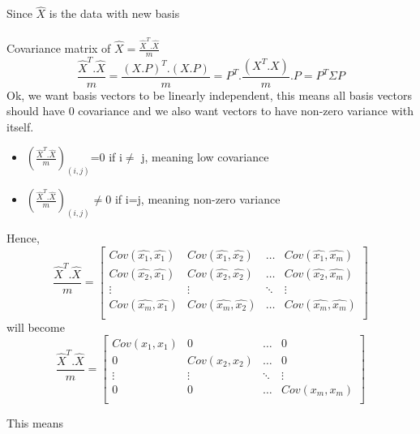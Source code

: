 \documentclass{article}
\begin{document}
Since $\hat{X}$ is the data with new basis\\\\
Covariance matrix of $\hat{X}=\frac{\hat{X}^T.\hat{X}}{m}$\\
$$
  \frac{\hat{X}^T.\hat{X}}{m}=\frac{(X.P)^T.(X.P)}{m}=P^T.\frac{(X^T.X)}{m}.P=P^T\Sigma P
$$
Ok, we want basis vectors to be linearly independent, this means all basis vectors should have 0 covariance and we also want vectors to have non-zero variance with itself.\\
\begin{tcolorbox}[colback=blue!5!white,colframe=blue!75!black,title=Ideal Basis Properties]
  \begin{itemize}
    \item $\left(\frac{\hat{X}^T.\hat{X}}{m}\right)_{(i,j)}$=0 if i$\neq$ j, meaning low covariance
    \item $\left(\frac{\hat{X}^T.\hat{X}}{m}\right)_{(i,j)}\neq$0 if i=j, meaning non-zero variance
  \end{itemize}
\end{tcolorbox}
Hence,\\
$$
  \frac{\hat{X}^T.\hat{X}}{m}=\begin{bmatrix}
    Cov(\hat{x_1},\hat{x_1}) & Cov(\hat{x_1},\hat{x_2}) & \dots  & Cov(\hat{x_1},\hat{x_m}) \\
    Cov(\hat{x_2},\hat{x_1}) & Cov(\hat{x_2},\hat{x_2}) & \dots  & Cov(\hat{x_2},\hat{x_m}) \\
    \vdots                   & \vdots                   & \ddots & \vdots                   \\
    Cov(\hat{x_m},\hat{x_1}) & Cov(\hat{x_m},\hat{x_2}) & \dots  & Cov(\hat{x_m},\hat{x_m}) \\
  \end{bmatrix}
$$
will become\\
$$
  \frac{\hat{X}^T.\hat{X}}{m}=\begin{bmatrix}
    Cov(x_1,x_1) & 0            & \dots  & 0            \\
    0            & Cov(x_2,x_2) & \dots  & 0            \\
    \vdots       & \vdots       & \ddots & \vdots       \\
    0            & 0            & \dots  & Cov(x_m,x_m) \\
  \end{bmatrix}
$$

This means\\\\
\pagebreak
\end{document}
